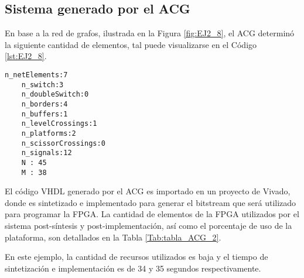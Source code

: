\subsection{Sistema generado por el ACG}

	En base a la red de grafos, ilustrada en la Figura \ref{fig:EJ2_8}, el ACG determinó la siguiente cantidad de elementos, tal puede visualizarse en el Código \ref{lst:EJ2_8}.
	
	\begin{lstlisting}[language = {}, caption = Cantidad de elementos a implementar por el ACG, label = {lst:EJ2_8}]
	n_netElements:7
	n_switch:3
	n_doubleSwitch:0
	n_borders:4
	n_buffers:1
	n_levelCrossings:1
	n_platforms:2
	n_scissorCrossings:0
	n_signals:12
	N : 45
	M : 38
	\end{lstlisting}
	
	El código VHDL generado por el ACG es importado en un proyecto de Vivado, donde es sintetizado e implementado para generar el bitstream que será utilizado para programar la FPGA. La cantidad de elementos de la FPGA utilizados por el sistema post-síntesis y post-implementación, así como el porcentaje de uso de la plataforma, son detallados en la Tabla \ref{Tab:tabla_ACG_2}.
	
	\begin{table}[H]
		{
			\caption{Síntesis e implementación del ejemplo 2 generado por el ACG.}
			\label{Tab:tabla_ACG_2}
			\centering
			\begin{center}
			\end{center}
		}    
	\end{table}
	
	En este ejemplo, la cantidad de recursos utilizados es baja y el tiempo de sintetización e implementación es de 34 y 35 segundos respectivamente.